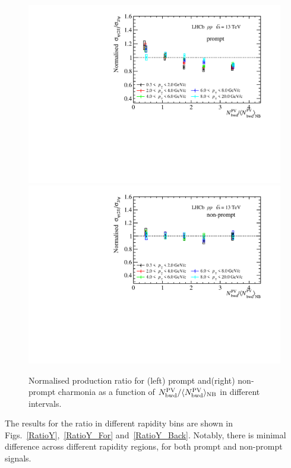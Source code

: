 \documentclass[12pt,a4paper]{article}
\begin{document}
\begin{figure}[H]
  \begin{center}
	  \vspace*{-0.5cm}
    \includegraphics[width=0.48\linewidth]{pdf/Result/promptRatioPTB.pdf}
    \includegraphics[width=0.48\linewidth]{pdf/Result/frombRatioPTB.pdf}
	  \vspace*{-0.5cm}
  \end{center}
	\caption{Normalised production ratio for (left) prompt and(right) non-prompt charmonia as a function of $N_{\rm bwd}^{\rm PV}/\langle N_{\rm bwd}^{\rm PV}\rangle_{\rm{NB}}$ in different \pt intervals.}
  \label{RatioPT_Back}
\end{figure}

The results for the ratio in different rapidity bins are shown in Figs.~\ref{RatioY},~\ref{RatioY_For} and~\ref{RatioY_Back}. Notably, there is minimal difference across different rapidity regions, for both prompt and non-prompt signals.
\end{document}
